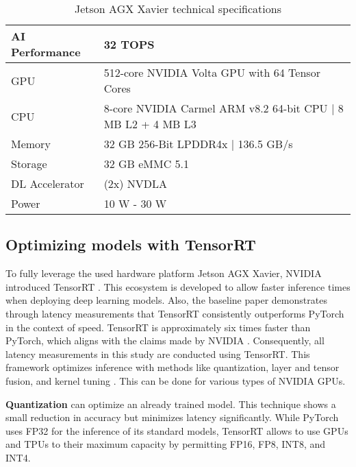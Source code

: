 \begin{table}[H]
    \centering
    \begin{tabular}{|l|l|}
        \hline
        AI Performance & 32 TOPS\\
        \hline
        \ac{GPU} & 512-core NVIDIA Volta GPU with 64 Tensor Cores\\
        \hline
        \ac{CPU} & 8-core NVIDIA Carmel ARM v8.2 64-bit CPU | 8 MB L2 + 4 MB L3\\
        \hline
        Memory & 32 GB 256-Bit LPDDR4x | 136.5 GB/s\\
        \hline
        Storage & 32 GB eMMC 5.1\\
        \hline
        DL Accelerator & (2x) NVDLA\\
        \hline
        Power & 10 W - 30 W\\
        \hline
    \end{tabular}
    \caption{Jetson AGX Xavier technical specifications \cite{nvidia_jetson_agx_xavier_datasheet}}
    \label{tab:jetson_AGX_xavier_specs}
\end{table}

\subsection{Optimizing models with TensorRT}

To fully leverage the used hardware platform Jetson AGX Xavier, NVIDIA introduced TensorRT \cite{nvidia_tensorrt}.
This ecosystem is developed to allow faster inference times when deploying deep learning models.
Also, the baseline paper \cite{tepNet2024} demonstrates through latency measurements that TensorRT consistently outperforms PyTorch in the context of speed.
TensorRT is approximately six times faster than PyTorch, which aligns with the claims made by NVIDIA \cite{tepNet2024} \cite{nvidia_tensorrt}.
Consequently, all latency measurements in this study are conducted using TensorRT.
This framework optimizes inference with methods like quantization, layer and tensor fusion, and kernel tuning \cite{nvidia_tensorrt}.
This can be done for various types of NVIDIA \ac{GPU}s.

\vspace{0.8cm}

\noindent\textbf{Quantization} can optimize an already trained model.
This technique shows a small reduction in accuracy but minimizes latency significantly.
While PyTorch uses FP32 for the inference of its standard models, TensorRT allows to use \ac{GPU}s and \ac{TPU}s to their maximum capacity by permitting FP16, FP8, INT8, and INT4.

